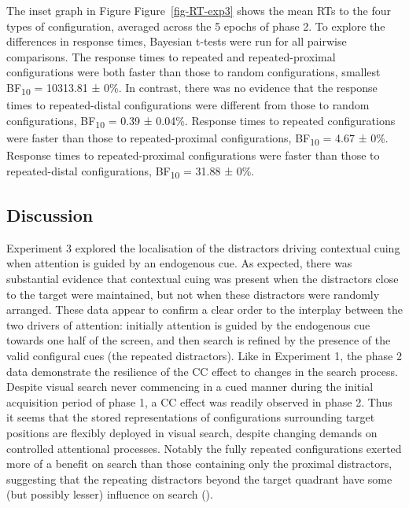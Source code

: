 \documentclass[
  man,
  floatsintext,
  longtable,
  nolmodern,
  notxfonts,
  notimes,
  colorlinks=true,linkcolor=blue,citecolor=blue,urlcolor=blue]{apa7}
\begin{document}
The inset graph in Figure Figure~\ref{fig-RT-exp3} shows the mean RTs to
the four types of configuration, averaged across the 5 epochs of phase
2. To explore the differences in response times, Bayesian t-tests were
run for all pairwise comparisons. The response times to repeated and
repeated-proximal configurations were both faster than those to random
configurations, smallest BF\textsubscript{10} = 10313.81 ± 0\%. In
contrast, there was no evidence that the response times to
repeated-distal configurations were different from those to random
configurations, BF\textsubscript{10} = 0.39 ± 0.04\%. Response times to
repeated configurations were faster than those to repeated-proximal
configurations, BF\textsubscript{10} = 4.67 ± 0\%. Response times to
repeated-proximal configurations were faster than those to
repeated-distal configurations, BF\textsubscript{10} = 31.88 ± 0\%.

\subsection{Discussion}\label{discussion-2}

Experiment 3 explored the localisation of the distractors driving
contextual cuing when attention is guided by an endogenous cue. As
expected, there was substantial evidence that contextual cuing was
present when the distractors close to the target were maintained, but
not when these distractors were randomly arranged. These data appear to
confirm a clear order to the interplay between the two drivers of
attention: initially attention is guided by the endogenous cue towards
one half of the screen, and then search is refined by the presence of
the valid configural cues (the repeated distractors). Like in Experiment
1, the phase 2 data demonstrate the resilience of the CC effect to
changes in the search process. Despite visual search never commencing in
a cued manner during the initial acquisition period of phase 1, a CC
effect was readily observed in phase 2. Thus it seems that the stored
representations of configurations surrounding target positions are
flexibly deployed in visual search, despite changing demands on
controlled attentional processes. Notably the fully repeated
configurations exerted more of a benefit on search than those containing
only the proximal distractors, suggesting that the repeating distractors
beyond the target quadrant have some (but possibly lesser) influence on
search ().
\end{document}
